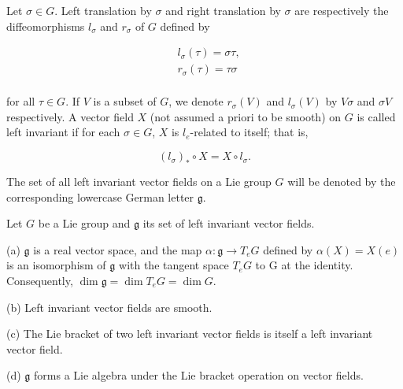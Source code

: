 \begin{definition}\label{thm:3.6}
Let $\sigma \in G$. Left translation by $\sigma$ and right translation by $\sigma$ are respectively the diffeomorphisms $l_{\sigma}$ and $r_{\sigma}$ of $G$ defined by 

\begin{equation}
\tag{1}\label{eq:3.6:1}
\begin{aligned}{}&{{}l_{\sigma}(\tau)=\sigma\tau,}\\ {}&{{}r_{\sigma}(\tau)=\tau\sigma}\\ \end{aligned}
\end{equation}

for all $\tau \in G$. If $V$ is a subset of $G$, we denote $r_{\sigma}(V)$ and $l_{\sigma}(V)$ by $V\sigma$ and $\sigma V$ respectively. A vector field $X$ (not assumed a priori to be smooth) on $G$ is called left invariant if for each $\sigma \in G$, $X$ is $l_e$-related to itself; that is,

\begin{equation}
\tag{2}\label{eq:3.6:2}
(l_{\sigma})_{*}\circ X=X\circ l_{\sigma}.
\end{equation}

The set of all left invariant vector fields on a Lie group $G$ will be denoted by the corresponding lowercase German letter $\mathfrak{g}$. 

\end{definition}

\begin{proposition}\label{thm:3.7}
Let $G$ be a Lie group and $\mathfrak{g}$ its set of left invariant vector fields.

(a) $\mathfrak{g}$ is a real vector space, and the map $\alpha: \mathfrak{g} \to T_{e} G$ defined by $\alpha(X) = X(e)$ is an isomorphism of $\mathfrak{g}$ with the tangent space $T_{e} G$ to G at the identity. Consequently, $\dim \mathfrak{g} = \dim T_{e} G = \dim G$.

(b) Left invariant vector fields are smooth.

(c) The Lie bracket of two left invariant vector fields is itself a left invariant vector field.

(d) $\mathfrak{g}$ forms a Lie algebra under the Lie bracket operation on vector fields.

\end{proposition}

